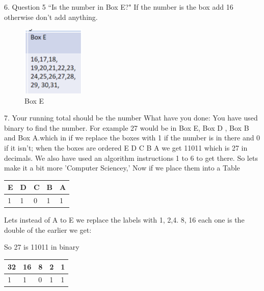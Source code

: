 6.	Question 5 “Is the number in Box E?" If the number is the box add 16 otherwise don't add anything.
\begin{figure}
    \centering
    \includegraphics[width=3cm]{chapters/chapterCT1/figures/BoxE.png}
    \caption{Box E}
    \label{fig:Box E}
\end{figure}
7.	Your running total should be the number
What have you done: You have used binary to find the number. For example 27 would be in Box E, Box D , Box B and Box A.which in if we replace the boxes with 1 if the number is in there and 0 if it isn’t; when the boxes are ordered E D C B A we get 11011 which is 27 in decimals. We also have used an algorithm instructions 1 to 6 to get there.
\newline
So lets make it a bit more 'Computer Sciencey,'
Now if we place them into a Table 
\begin{tabular}{lllll} \hline
E & D & C & B & A	 	 \\ \hline
1  & 1  & 0 &  1 & 1\\ \hline

\end{tabular}

Lets instead of A to E we replace the labels with 1, 2,4. 8, 16 each one is the double of the earlier we get:


So 27 is 11011 in binary
\begin{tabular}{lllll} \hline
32 & 16 & 8 & 2 & 1 	 \\ \hline
1  & 1  & 0 &  1 & 1\\ \hline

\end{tabular}
